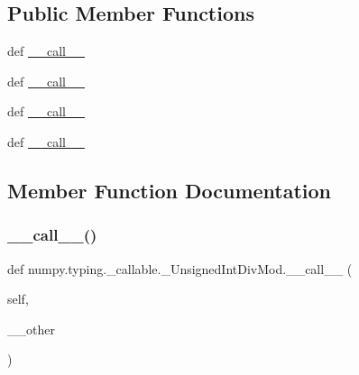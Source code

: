 \subsection*{Public Member Functions}
\begin{DoxyCompactItemize}
\item 
def \hyperlink{classnumpy_1_1typing_1_1__callable_1_1__UnsignedIntDivMod_a6fc719e7b4233467853b2973ef71d5fc}{\+\_\+\+\_\+call\+\_\+\+\_\+}
\item 
def \hyperlink{classnumpy_1_1typing_1_1__callable_1_1__UnsignedIntDivMod_a6fc719e7b4233467853b2973ef71d5fc}{\+\_\+\+\_\+call\+\_\+\+\_\+}
\item 
def \hyperlink{classnumpy_1_1typing_1_1__callable_1_1__UnsignedIntDivMod_a6fc719e7b4233467853b2973ef71d5fc}{\+\_\+\+\_\+call\+\_\+\+\_\+}
\item 
def \hyperlink{classnumpy_1_1typing_1_1__callable_1_1__UnsignedIntDivMod_a6fc719e7b4233467853b2973ef71d5fc}{\+\_\+\+\_\+call\+\_\+\+\_\+}
\end{DoxyCompactItemize}


\subsection{Member Function Documentation}
\mbox{\label{classnumpy_1_1typing_1_1__callable_1_1__UnsignedIntDivMod_a6fc719e7b4233467853b2973ef71d5fc}} 
\subsubsection{\texorpdfstring{\+\_\+\+\_\+call\+\_\+\+\_\+()}{\_\_call\_\_()}\hspace{0.1cm}{\footnotesize\ttfamily [1/4]}}
{\footnotesize\ttfamily def numpy.\+typing.\+\_\+callable.\+\_\+\+Unsigned\+Int\+Div\+Mod.\+\_\+\+\_\+call\+\_\+\+\_\+ (\begin{DoxyParamCaption}\item[{}]{self,  }\item[{}]{\+\_\+\+\_\+other }\end{DoxyParamCaption})}

